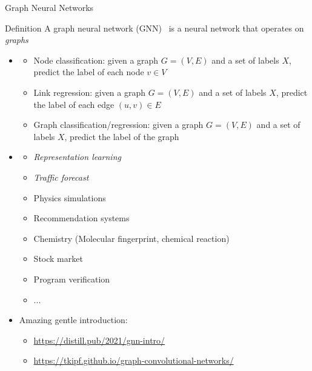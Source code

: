 \documentclass[presentation, 9pt]{beamer}\mode<presentation>{\usetheme{AMSBolognaFC}}
\begin{document}
\begin{frame}{Graph Neural Networks}
\begin{alertblock}{Definition}
	A graph neural network (GNN)~ is a neural network that operates on \textit{graphs}
\end{alertblock}
\begin{itemize}
	\item {}
	\begin{itemize}
		\item Node classification: given a graph $G=(V,E)$ and a set of labels $X$, predict the label of each node $v \in V$
		\item Link regression: given a graph $G=(V,E)$ and a set of labels $X$, predict the label of each edge $(u,v) \in E$
		\item Graph classification/regression: given a graph $G=(V,E)$ and a set of labels $X$, predict the label of the graph
	\end{itemize}
	\item {}
	\begin{itemize}
		\item \emph{Representation learning}
		\item \emph{Traffic forecast}~
		\item Physics simulations~
		\item Recommendation systems~
		\item Chemistry (Molecular fingerprint, chemical reaction)~
		\item Stock market~
		\item Program verification~
		\item ...
	\end{itemize}
	\item Amazing gentle introduction: 
	\begin{itemize}
		\item \url{https://distill.pub/2021/gnn-intro/}
		\item \url{https://tkipf.github.io/graph-convolutional-networks/}
	\end{itemize}
\end{itemize}
\end{frame}
\end{document}
